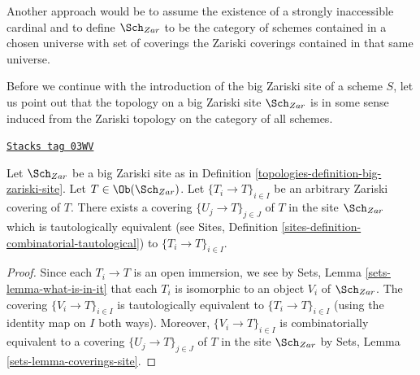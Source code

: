 \medskip\noindent
Another approach would be to assume the existence of a
strongly inaccessible cardinal and to define $\Sch_{Zar}$
to be the category of schemes contained in a chosen universe with
set of coverings the Zariski coverings contained in that same
universe.

\medskip\noindent
Before we continue with the introduction of the big Zariski site of
a scheme $S$, let us point out that the topology on a big Zariski site
$\Sch_{Zar}$ is in some sense induced from the Zariski topology
on the category of all schemes.

\begin{lemma}
\label{topologies-lemma-zariski-induced}
\href{https://stacks.math.columbia.edu/tag/03WV}{\texttt{Stacks tag 03WV}}

Let $\Sch_{Zar}$ be a big Zariski site as in
Definition \ref{topologies-definition-big-zariski-site}.
Let $T \in \Ob(\Sch_{Zar})$.
Let $\{T_i \to T\}_{i \in I}$ be an arbitrary Zariski covering of $T$.
There exists a covering $\{U_j \to T\}_{j \in J}$ of $T$ in the site
$\Sch_{Zar}$ which is tautologically equivalent (see
Sites, Definition \ref{sites-definition-combinatorial-tautological})
to $\{T_i \to T\}_{i \in I}$.
\end{lemma}

\begin{proof}
Since each $T_i \to T$ is an open immersion, we see by
Sets, Lemma \ref{sets-lemma-what-is-in-it}
that each $T_i$ is isomorphic to an object $V_i$ of $\Sch_{Zar}$.
The covering $\{V_i \to T\}_{i \in I}$ is tautologically equivalent
to $\{T_i \to T\}_{i \in I}$ (using the identity map on $I$ both ways).
Moreover, $\{V_i \to T\}_{i \in I}$ is combinatorially equivalent to a
covering $\{U_j \to T\}_{j \in J}$ of $T$ in the site $\Sch_{Zar}$ by
Sets, Lemma \ref{sets-lemma-coverings-site}.
\end{proof}


